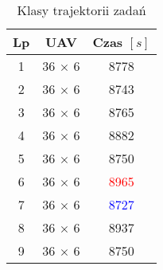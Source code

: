 

\begin{table}[H]
    \caption{Klasy trajektorii zadań}
    \label{tab2}
    \centering
    \begin{tabular}{ccc}
        \toprule
        \textbf{Lp} & \textbf{UAV}  & \textbf{Czas $\left [ s \right ]$} \\ \toprule
        1           & 36 $\times$ 6 & 8778                               \\
        2           & 36 $\times$ 6 & 8743                               \\
        3           & 36 $\times$ 6 & 8765                               \\
        4           & 36 $\times$ 6 & 8882                               \\
        5           & 36 $\times$ 6 & 8750                               \\
        6           & 36 $\times$ 6 & \textcolor{red}{8965}              \\
        7           & 36 $\times$ 6 & \textcolor{blue}{8727}             \\
        8           & 36 $\times$ 6 & 8937                               \\
        9           & 36 $\times$ 6 & 8750                               \\ \bottomrule
    \end{tabular}
\end{table}


